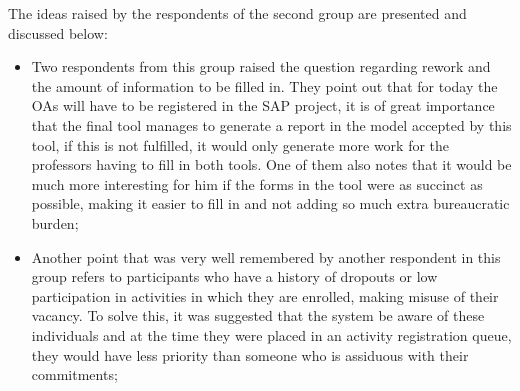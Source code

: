 The ideas raised by the respondents of the second group are presented and discussed below:
\begin{itemize}

\item Two respondents from this group raised the question regarding rework and the amount of information to be filled in. They point out that for today the \aclp{OA} will have to be registered in the \ac{SAP} project, it is of great importance that the final tool manages to generate a report in the model accepted by this tool, if this is not fulfilled, it would only generate more work for the professors having to fill in both tools. One of them also notes that it would be much more interesting for him if the forms in the tool were as succinct as possible, making it easier to fill in and not adding so much extra bureaucratic burden;


\item Another point that was very well remembered by another respondent in this group refers to participants who have a history of dropouts or low participation in activities in which they are enrolled, making misuse of their vacancy. To solve this, it was suggested that the system be aware of these individuals and at the time they were placed in an activity registration queue, they would have less priority than someone who is assiduous with their commitments;


\end{itemize}
